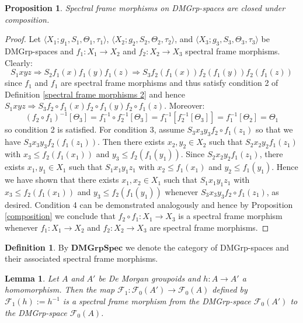 \documentclass{amsart}
\theoremstyle{plain}
\newtheorem{lemma}[theorem]{Lemma}
\newtheorem{proposition}[theorem]{Proposition}
\theoremstyle{definition}
\newtheorem{definition}[theorem]{Definition}
\begin{document}
\begin{proposition}
    Spectral frame morphisms on DMGrp-spaces are closed under composition. 
\end{proposition}
\begin{proof}
     Let $\langle X_1;g_1,S_1,\Theta_1,\tau_1\rangle$, $\langle X_2;g_2,S_2,\Theta_2,\tau_2\rangle$, and $\langle X_3;g_3,S_3,\Theta_3,\tau_3\rangle$  be DMGrp-spaces and $f_1\colon X_1\to X_2$ and $f_2\colon X_2\to X_3$ spectral frame morphisms. Clearly: 
     \[S_1xyz\Longrightarrow S_2f_1(x)f_1(y)f_1(z)\Longrightarrow S_3f_2(f_1(x))f_2(f_1(y))f_2(f_1(z))\] since $f_1$ and $f_1$ are spectral frame morphisms and thus satisfy condition 2 of Definition \ref{spectral frame morphisms 2} and hence $S_1xyz\Longrightarrow S_3f_2\circ f_1(x)f_2\circ f_1(y)f_2\circ f_1(z)$. Moreover: 
     \[(f_2\circ f_1)^{-1}[\Theta_3]=f^{-1}_1\circ f^{-1}_2[\Theta_3]=f^{-1}_1[f^{-1}_2[\Theta_3]]=f^{-1}_1[\Theta_2]=\Theta_1\] so condition 2 is satisfied. For condition 3, assume $S_3x_3y_3f_2\circ f_1(z_1)$ so that we have $S_3x_3y_3f_2(f_1(z_1))$. Then there exists $x_2,y_2\in X_2$ such that $S_2x_2y_2f_1(z_1)$ with $x_3\leqslant f_2(f_1(x_1))$ and $y_3\leqslant f_2(f_1(y_1))$. Since $S_2x_2y_2f_1(z_1)$, there exists $x_1,y_1\in X_1$ such that $S_1x_1y_1z_1$ with $x_2\leqslant f_1(x_1)$ and $y_2\leqslant f_1(y_1)$. Hence we have shown that there exists $x_1,x_2\in X_1$ such that $S_1x_1y_1z_1$ with $x_3\leqslant f_2(f_1(x_1))$ and $y_3\leqslant f_2(f_1(y_1))$ whenever  $S_3x_3y_3f_2\circ f_1(z_1)$, as desired. Condition 4 can be demonstrated analogously and hence by Proposition \ref{composition} we conclude that $f_2\circ f_1\colon X_1\to X_3$ is a spectral frame morphism whenever $f_1\colon X_1\to X_2$ and $f_2\colon X_2\to X_3$ are spectral frame morphisms.    
\end{proof}
\begin{definition}
    By $\mathbf{DMGrpSpec}$ we denote the category of DMGrp-spaces and their associated spectral frame morphisms.  
\end{definition}
\begin{lemma}\label{lemma 4.20}
       Let $A$ and $A'$ be De Morgan groupoids and $h\colon A\to A'$ a homomorphism. Then the map $\mathcal{F}_1\colon\mathcal{F}_0(A')\to\mathcal{F}_0(A)$ defined by $\mathcal{F}_1(h):=h^{-1}$ is a spectral frame morphism from the DMGrp-space $\mathcal{F}_0(A')$ to the DMGrp-space $\mathcal{F}_0(A)$.  
\end{lemma}
\end{document}
